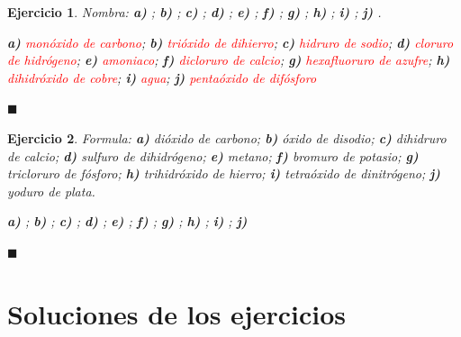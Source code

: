\documentclass[12pt]{article}
\theoremstyle{mygreennumbox}
\newtheorem{ejercicioT}{Ejercicio}[section]
\newenvironment{exercise}{\begin{eBoxmygreen}\begin{ejercicioT}}{\hfill{\color{mygreen}\tiny\ensuremath{\blacksquare}}\end{ejercicioT}\end{eBoxmygreen}}
\begin{document}
\begin{exercise}
    Nombra: \textbf{a)} ; \textbf{b)} ; \textbf{c)} ; \textbf{d)} ; \textbf{e)} ; \textbf{f)} ; \textbf{g)} ; \textbf{h)} ; \textbf{i)} ; \textbf{j)} .
    \begin{solu}
        \textbf{a)} \textcolor{red}{monóxido de carbono}; \textbf{b)} \textcolor{red}{trióxido de dihierro}; \textbf{c)} \textcolor{red}{hidruro de sodio}; \textbf{d)} \textcolor{red}{cloruro de hidrógeno}; \textbf{e)} \textcolor{red}{amoniaco}; \textbf{f)} \textcolor{red}{dicloruro de calcio}; \textbf{g)} \textcolor{red}{hexafluoruro de azufre}; \textbf{h)} \textcolor{red}{dihidróxido de cobre}; \textbf{i)} \textcolor{red}{agua}; \textbf{j)} \textcolor{red}{pentaóxido de difósforo}
    \end{solu}
\end{exercise}

\begin{exercise}
    Formula: \textbf{a)} dióxido de carbono; \textbf{b)} óxido de disodio; \textbf{c)} dihidruro de calcio; \textbf{d)} sulfuro de dihidrógeno; \textbf{e)} metano; \textbf{f)} bromuro de potasio; \textbf{g)} tricloruro de fósforo; \textbf{h)} trihidróxido de hierro; \textbf{i)} tetraóxido de dinitrógeno; \textbf{j)} yoduro de plata.
    \begin{solu}
        \textbf{a)} \textcolor{red}{}; \textbf{b)} \textcolor{red}{}; \textbf{c)} \textcolor{red}{}; \textbf{d)} \textcolor{red}{}; \textbf{e)} \textcolor{red}{}; \textbf{f)} \textcolor{red}{}; \textbf{g)} \textcolor{red}{}; \textbf{h)} \textcolor{red}{}; \textbf{i)} \textcolor{red}{}; \textbf{j)} \textcolor{red}{}
    \end{solu}
\end{exercise}

\newpage
\section*{Soluciones de los ejercicios}

\end{document}
